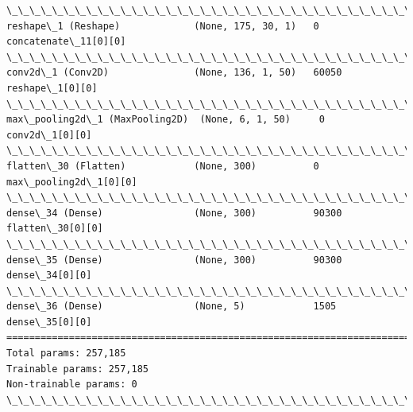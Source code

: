 \documentclass[11pt]{article}
\begin{document}
\begin{Verbatim}[commandchars=\\\{\}]
\_\_\_\_\_\_\_\_\_\_\_\_\_\_\_\_\_\_\_\_\_\_\_\_\_\_\_\_\_\_\_\_\_\_\_\_\_\_\_\_\_\_\_\_\_\_\_\_\_\_\_\_\_\_\_\_\_\_\_\_\_\_\_\_\_\_\_\_\_\_\_\_\_\_\_\_\_\_\_\_\_\_\_\_\_\_\_\_\_\_\_\_\_\_\_\_\_\_
reshape\_1 (Reshape)             (None, 175, 30, 1)   0           concatenate\_11[0][0]             
\_\_\_\_\_\_\_\_\_\_\_\_\_\_\_\_\_\_\_\_\_\_\_\_\_\_\_\_\_\_\_\_\_\_\_\_\_\_\_\_\_\_\_\_\_\_\_\_\_\_\_\_\_\_\_\_\_\_\_\_\_\_\_\_\_\_\_\_\_\_\_\_\_\_\_\_\_\_\_\_\_\_\_\_\_\_\_\_\_\_\_\_\_\_\_\_\_\_
conv2d\_1 (Conv2D)               (None, 136, 1, 50)   60050       reshape\_1[0][0]                  
\_\_\_\_\_\_\_\_\_\_\_\_\_\_\_\_\_\_\_\_\_\_\_\_\_\_\_\_\_\_\_\_\_\_\_\_\_\_\_\_\_\_\_\_\_\_\_\_\_\_\_\_\_\_\_\_\_\_\_\_\_\_\_\_\_\_\_\_\_\_\_\_\_\_\_\_\_\_\_\_\_\_\_\_\_\_\_\_\_\_\_\_\_\_\_\_\_\_
max\_pooling2d\_1 (MaxPooling2D)  (None, 6, 1, 50)     0           conv2d\_1[0][0]                   
\_\_\_\_\_\_\_\_\_\_\_\_\_\_\_\_\_\_\_\_\_\_\_\_\_\_\_\_\_\_\_\_\_\_\_\_\_\_\_\_\_\_\_\_\_\_\_\_\_\_\_\_\_\_\_\_\_\_\_\_\_\_\_\_\_\_\_\_\_\_\_\_\_\_\_\_\_\_\_\_\_\_\_\_\_\_\_\_\_\_\_\_\_\_\_\_\_\_
flatten\_30 (Flatten)            (None, 300)          0           max\_pooling2d\_1[0][0]            
\_\_\_\_\_\_\_\_\_\_\_\_\_\_\_\_\_\_\_\_\_\_\_\_\_\_\_\_\_\_\_\_\_\_\_\_\_\_\_\_\_\_\_\_\_\_\_\_\_\_\_\_\_\_\_\_\_\_\_\_\_\_\_\_\_\_\_\_\_\_\_\_\_\_\_\_\_\_\_\_\_\_\_\_\_\_\_\_\_\_\_\_\_\_\_\_\_\_
dense\_34 (Dense)                (None, 300)          90300       flatten\_30[0][0]                 
\_\_\_\_\_\_\_\_\_\_\_\_\_\_\_\_\_\_\_\_\_\_\_\_\_\_\_\_\_\_\_\_\_\_\_\_\_\_\_\_\_\_\_\_\_\_\_\_\_\_\_\_\_\_\_\_\_\_\_\_\_\_\_\_\_\_\_\_\_\_\_\_\_\_\_\_\_\_\_\_\_\_\_\_\_\_\_\_\_\_\_\_\_\_\_\_\_\_
dense\_35 (Dense)                (None, 300)          90300       dense\_34[0][0]                   
\_\_\_\_\_\_\_\_\_\_\_\_\_\_\_\_\_\_\_\_\_\_\_\_\_\_\_\_\_\_\_\_\_\_\_\_\_\_\_\_\_\_\_\_\_\_\_\_\_\_\_\_\_\_\_\_\_\_\_\_\_\_\_\_\_\_\_\_\_\_\_\_\_\_\_\_\_\_\_\_\_\_\_\_\_\_\_\_\_\_\_\_\_\_\_\_\_\_
dense\_36 (Dense)                (None, 5)            1505        dense\_35[0][0]                   
==================================================================================================
Total params: 257,185
Trainable params: 257,185
Non-trainable params: 0
\_\_\_\_\_\_\_\_\_\_\_\_\_\_\_\_\_\_\_\_\_\_\_\_\_\_\_\_\_\_\_\_\_\_\_\_\_\_\_\_\_\_\_\_\_\_\_\_\_\_\_\_\_\_\_\_\_\_\_\_\_\_\_\_\_\_\_\_\_\_\_\_\_\_\_\_\_\_\_\_\_\_\_\_\_\_\_\_\_\_\_\_\_\_\_\_\_\_

    \end{Verbatim}
\end{document}
